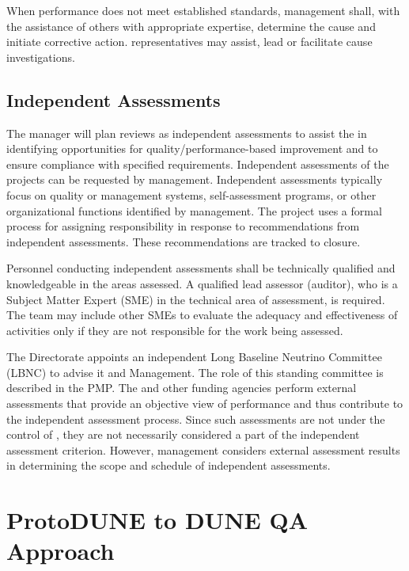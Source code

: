 When performance does not meet established standards, management
shall, with the assistance of others with appropriate expertise,
determine the cause and initiate corrective action. 
representatives may assist, lead or facilitate cause investigations.

\subsection{Independent Assessments}

The   manager will plan reviews as
independent assessments to assist the   in
identifying opportunities for quality/performance-based improvement
and to ensure compliance with specified requirements. Independent
assessments of the  projects can be requested by
 management. Independent assessments typically focus on
quality or  management systems, self-assessment programs, or
other organizational functions identified by management. The
 project uses a formal process for assigning
responsibility in response to recommendations from independent
assessments. These recommendations are tracked to closure.

Personnel conducting independent assessments shall be technically
qualified and knowledgeable in the areas assessed. A qualified lead
assessor (auditor), who is a Subject Matter Expert (SME) in the
technical area of assessment, is required. The team may include other
SMEs to evaluate the adequacy and effectiveness of activities only if
they are not responsible for the work being assessed.

The \fnal Directorate appoints an independent Long Baseline Neutrino
Committee (LBNC) to advise it and  Management. The role of
this standing committee is described in the 
PMP. The  and other funding agencies perform external
assessments that provide an objective view of performance and thus
contribute to the independent assessment process. Since such
assessments are not under the control of , they are not
necessarily considered a part of the independent assessment
criterion. However,  management considers external
assessment results in determining the scope and schedule of
independent assessments.

\section{ProtoDUNE to DUNE QA Approach}

